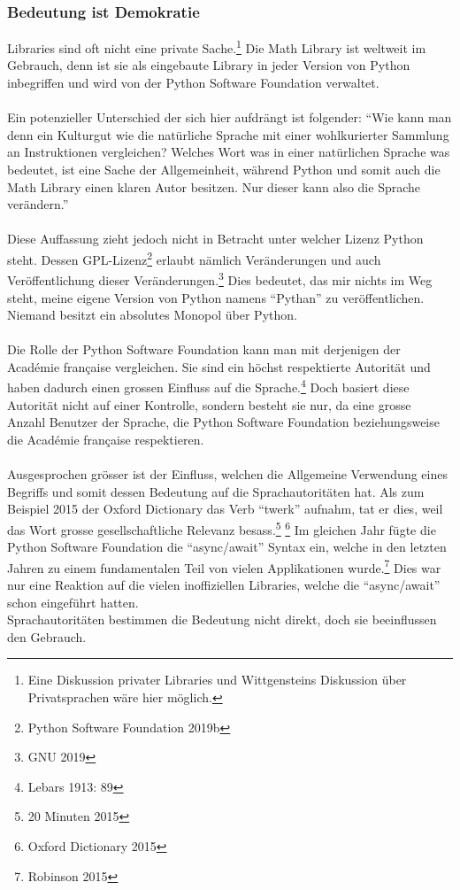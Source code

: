 \documentclass[a4paper,10pt]{article}
\begin{document}
\subsubsection{Bedeutung ist Demokratie}
Libraries sind oft nicht eine private Sache.\footnote{Eine Diskussion privater Libraries und Wittgensteins Diskussion über Privatsprachen wäre hier möglich.} Die Math Library ist weltweit im Gebrauch, denn ist sie als eingebaute Library in jeder Version von Python inbegriffen und wird von der Python Software Foundation verwaltet. \\
\\
Ein potenzieller Unterschied der sich hier aufdrängt ist folgender: \enquote{Wie kann man denn ein Kulturgut wie die natürliche Sprache mit einer wohlkurierter Sammlung an Instruktionen vergleichen? Welches Wort was in einer natürlichen Sprache was bedeutet, ist eine Sache der Allgemeinheit, während Python und somit auch die Math Library einen klaren Autor besitzen. Nur dieser kann also die Sprache verändern.} \\
\\
Diese Auffassung zieht jedoch nicht in Betracht unter welcher Lizenz Python steht. Dessen GPL-Lizenz\footnote{Python Software Foundation 2019b} erlaubt nämlich Veränderungen und auch Veröffentlichung dieser Veränderungen.\footnote{GNU 2019} Dies bedeutet, das mir nichts im Weg steht, meine eigene Version von Python namens \enquote{Pythan} zu veröffentlichen. Niemand besitzt ein absolutes Monopol über Python. \\
\\
Die Rolle der Python Software Foundation kann man mit derjenigen der Académie française vergleichen. Sie sind ein höchst respektierte Autorität und haben dadurch einen grossen Einfluss auf die Sprache.\footnote{Lebars 1913: 89} Doch basiert diese Autorität nicht auf einer Kontrolle, sondern besteht sie nur, da eine grosse Anzahl Benutzer der Sprache, die Python Software Foundation beziehungsweise die Académie française respektieren. \\
\\
Ausgesprochen grösser ist der Einfluss, welchen die Allgemeine Verwendung eines Begriffs und somit dessen Bedeutung auf die Sprachautoritäten hat. Als zum Beispiel 2015 der Oxford Dictionary das Verb \enquote{twerk} aufnahm, tat er dies, weil das Wort grosse gesellschaftliche Relevanz besass.\footnote{20 Minuten 2015} \footnote{Oxford Dictionary 2015} Im gleichen Jahr fügte die Python Software Foundation die \enquote{async/await} Syntax ein, welche in den letzten Jahren zu einem fundamentalen Teil von vielen Applikationen wurde.\footnote{Robinson 2015} Dies war nur eine Reaktion auf die vielen inoffiziellen Libraries, welche die \enquote{async/await} schon eingeführt hatten. \\
Sprachautoritäten bestimmen die Bedeutung nicht direkt, doch sie beeinflussen den Gebrauch.
\end{document}
